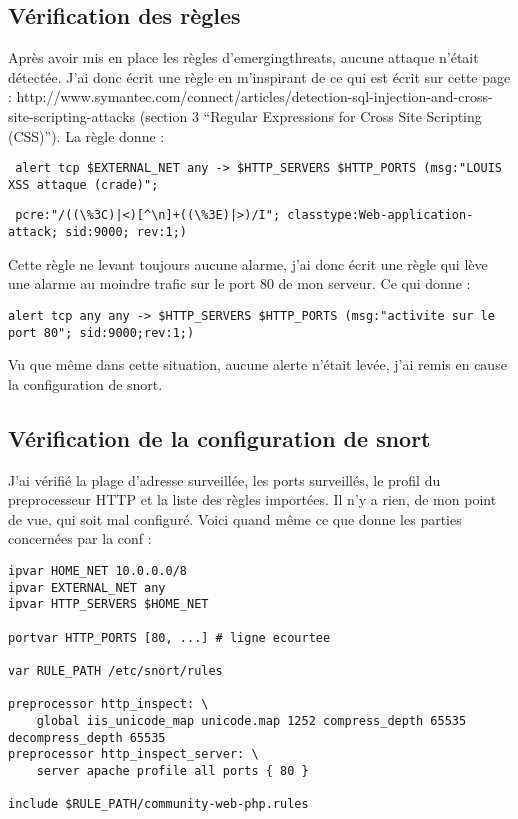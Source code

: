\documentclass[oneside,10pt]{article}
\begin{document}
\subsection{V\'erification des r\`egles}
Apr\`es avoir mis en place les r\`egles d'emergingthreats, aucune attaque n'\'etait d\'etect\'ee.
J'ai donc \'ecrit une r\`egle en m'inspirant de ce qui est \'ecrit sur cette page : http://www.symantec.com/connect/articles/detection-sql-injection-and-cross-site-scripting-attacks (section 3 ``Regular Expressions for Cross Site Scripting (CSS)'').
La r\`egle donne :
\begin{verbatim} alert tcp $EXTERNAL_NET any -> $HTTP_SERVERS $HTTP_PORTS (msg:"LOUIS XSS attaque (crade)";\end{verbatim}
\begin{verbatim} pcre:"/((\%3C)|<)[^\n]+((\%3E)|>)/I"; classtype:Web-application-attack; sid:9000; rev:1;) \end{verbatim}
Cette r\`egle ne levant toujours aucune alarme, j'ai donc \'ecrit une r\`egle qui l\`eve une alarme au moindre trafic sur le port 80 de mon serveur.
Ce qui donne :
\begin{verbatim}alert tcp any any -> $HTTP_SERVERS $HTTP_PORTS (msg:"activite sur le port 80"; sid:9000;rev:1;)\end{verbatim}
Vu que m\^eme dans cette situation, aucune alerte n'\'etait lev\'ee, j'ai remis en cause la configuration de snort.

\subsection{V\'erification de la configuration de snort}
J'ai v\'erifi\'e la plage d'adresse surveill\'ee, les ports surveill\'es, le profil du preprocesseur HTTP et la liste des r\`egles import\'ees.
Il n'y a rien, de mon point de vue, qui soit mal configur\'e.
Voici quand m\^eme ce que donne les parties concern\'ees par la conf :
\begin{verbatim}
ipvar HOME_NET 10.0.0.0/8
ipvar EXTERNAL_NET any
ipvar HTTP_SERVERS $HOME_NET

portvar HTTP_PORTS [80, ...] # ligne ecourtee

var RULE_PATH /etc/snort/rules

preprocessor http_inspect: \
    global iis_unicode_map unicode.map 1252 compress_depth 65535 decompress_depth 65535
preprocessor http_inspect_server: \
    server apache profile all ports { 80 }

include $RULE_PATH/community-web-php.rules
\end{verbatim}
\end{document}
